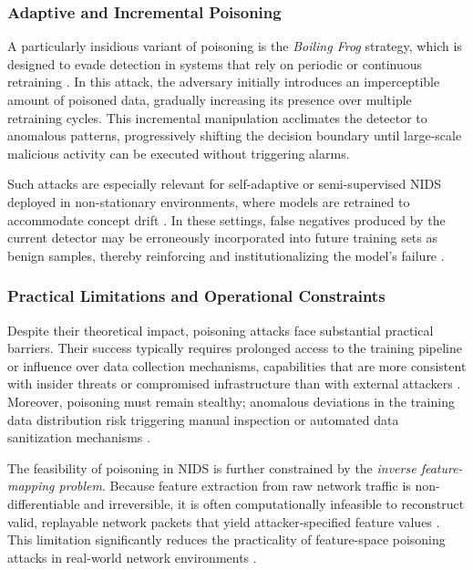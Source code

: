 \subsubsection{Adaptive and Incremental Poisoning}

A particularly insidious variant of poisoning is the \emph{Boiling Frog} strategy, which is designed to evade detection in systems that rely on periodic or continuous retraining \cite{rubinstein2009antidote}. 
In this attack, the adversary initially introduces an imperceptible amount of poisoned data, gradually increasing its presence over multiple retraining cycles. 
This incremental manipulation acclimates the detector to anomalous patterns, progressively shifting the decision boundary until large-scale malicious activity can be executed without triggering alarms.

Such attacks are especially relevant for self-adaptive or semi-supervised NIDS deployed in non-stationary environments, where models are retrained to accommodate concept drift \cite{madani2018robustness}. 
In these settings, false negatives produced by the current detector may be erroneously incorporated into future training sets as benign samples, thereby reinforcing and institutionalizing the model’s failure \cite{he2023adversarial}.

\subsubsection{Practical Limitations and Operational Constraints}

Despite their theoretical impact, poisoning attacks face substantial practical barriers. 
Their success typically requires prolonged access to the training pipeline or influence over data collection mechanisms, capabilities that are more consistent with insider threats or compromised infrastructure than with external attackers \cite{ennaji2025adversarial}. 
Moreover, poisoning must remain stealthy; anomalous deviations in the training data distribution risk triggering manual inspection or automated data sanitization mechanisms \cite{rubinstein2009antidote}.

The feasibility of poisoning in NIDS is further constrained by the \emph{inverse feature-mapping problem}. 
Because feature extraction from raw network traffic is non-differentiable and irreversible, it is often computationally infeasible to reconstruct valid, replayable network packets that yield attacker-specified feature values \cite{han2021evaluating}. 
This limitation significantly reduces the practicality of feature-space poisoning attacks in real-world network environments \cite{miller2020adversarial}.

